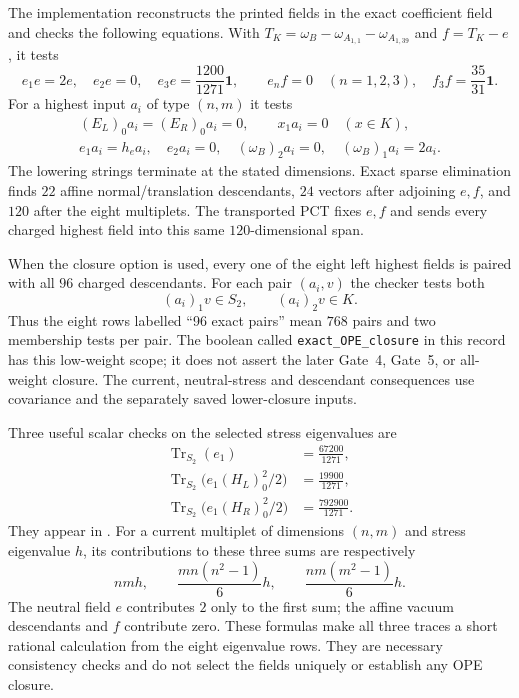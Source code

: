 The implementation 
reconstructs the printed fields in the exact coefficient field and
checks the following equations. With
$T_K=\omega_B-\omega_{A_{1,1}}-\omega_{A_{1,39}}$ and $f=T_K-e$,
it tests
\[
 e_1e=2e,\quad e_2e=0,\quad
 e_3e=\frac{1200}{1271}\mathbf1,
 \qquad e_nf=0\quad(n=1,2,3),\quad
 f_3f=\frac{35}{31}\mathbf1.
\]
For a highest input $a_i$ of type $(n,m)$ it tests
\begin{gather*}
(E_L)_0a_i=(E_R)_0a_i=0,\qquad
x_1a_i=0\quad(x\in K),\\
e_1a_i=h_ea_i,\quad e_2a_i=0,\quad
(\omega_B)_2a_i=0,\quad (\omega_B)_1a_i=2a_i.
\end{gather*}
The lowering strings terminate at the stated dimensions. Exact sparse
elimination finds $22$ affine normal/translation descendants, $24$
vectors after adjoining $e,f$, and $120$ after the eight multiplets.
The transported PCT fixes $e,f$ and sends every charged highest field
into this same $120$-dimensional span.

When the closure option is used, every one of the eight left highest
fields is paired with all $96$ charged descendants. For each pair
$(a_i,v)$ the checker tests both
\[
 (a_i)_1v\in S_2,\qquad (a_i)_2v\in K.
\]
Thus the eight rows labelled ``96 exact pairs'' mean $768$ pairs and
two membership tests per pair. The boolean called
\texttt{exact\_OPE\_closure} in this record has this low-weight scope;
it does not assert the later Gate~4, Gate~5, or all-weight closure.
The current, neutral-stress and descendant consequences use covariance
and the separately saved lower-closure inputs.

Three useful scalar checks on the selected stress eigenvalues are
\begin{align*}
\operatorname{Tr}_{S_2}(e_1)&=\frac{67200}{1271},\\
\operatorname{Tr}_{S_2}\bigl(e_1(H_L)_0^2/2\bigr)
   &=\frac{19900}{1271},\\
\operatorname{Tr}_{S_2}\bigl(e_1(H_R)_0^2/2\bigr)
   &=\frac{792900}{1271}.
\end{align*}
They appear in .
For a current multiplet of dimensions $(n,m)$ and stress eigenvalue
$h$, its contributions to these three sums are respectively
\[
 nmh,\qquad \frac{mn(n^2-1)}6h,
 \qquad\frac{nm(m^2-1)}6h.
\]
The neutral field $e$ contributes $2$ only to the first sum; the affine
vacuum descendants and $f$ contribute zero. These formulas make all
three traces a short rational calculation from the eight eigenvalue
rows. They are necessary consistency checks and do not select the
fields uniquely or establish any OPE closure.

